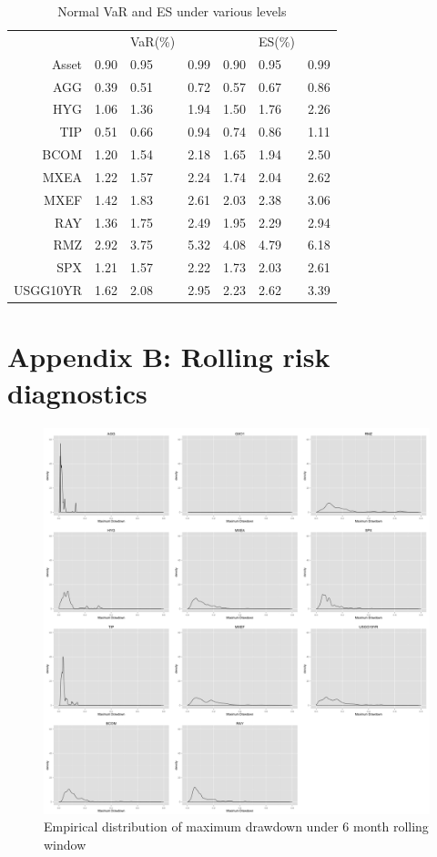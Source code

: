 \documentclass[11pt]{article}
\begin{document}
\begin{table}[H]
\centering 
\begin{tabular}{ | r || p{1cm} p{1cm} p{1cm} || p{1cm} p{1cm} p{1cm} | } 
 \hline
 & & VaR(\%) &&& ES(\%) & \\
Asset& 0.90 & 0.95 & 0.99 & 0.90 & 0.95 & 0.99 \\
  \hline \hline
AGG & 0.39 & 0.51 & 0.72 & 0.57 & 0.67 & 0.86\\ 
HYG & 1.06 & 1.36 & 1.94 & 1.50 & 1.76 & 2.26\\ 
TIP & 0.51 & 0.66 & 0.94 & 0.74 & 0.86 & 1.11\\ 
BCOM & 1.20 & 1.54 & 2.18 & 1.65 & 1.94 & 2.50\\ 
MXEA & 1.22 & 1.57 & 2.24 & 1.74 & 2.04 & 2.62\\ 
MXEF & 1.42 & 1.83 & 2.61 & 2.03 & 2.38 & 3.06\\ 
RAY & 1.36 & 1.75 & 2.49 & 1.95 & 2.29 & 2.94\\ 
RMZ & 2.92 & 3.75 & 5.32 & 4.08 & 4.79 & 6.18\\ 
SPX & 1.21 & 1.57 & 2.22 & 1.73 & 2.03 & 2.61\\ 
USGG10YR & 1.62 & 2.08 & 2.95 & 2.23 & 2.62 & 3.39\\
 \hline
\end{tabular}
\caption{Normal VaR and ES under various levels}
\label{table:VaRESNormal}
\end{table}



\section{Appendix B: Rolling risk diagnostics} \label{App:AppendixB}

\begin{figure}[H]
\centering
\includegraphics[width=15cm]{../results/maxdd_dist_mon6}
\caption{Empirical distribution of maximum drawdown under 6 month rolling window} 
\label{fig: dist_mdd}
\end{figure}
\end{document}
